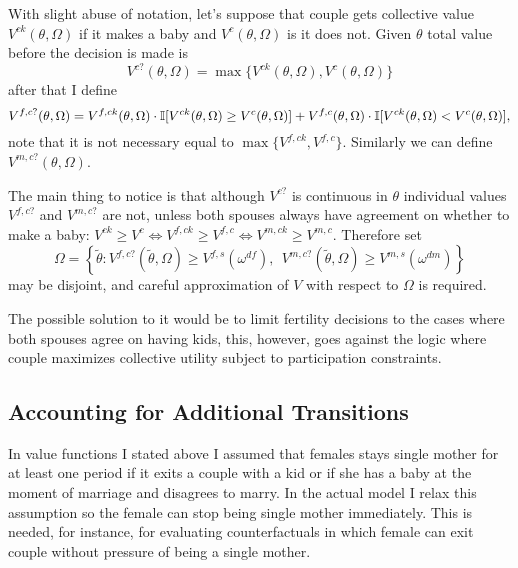 With slight abuse of notation, let's suppose that couple gets collective value $V^{ck}(\theta,\Omega)$ if it makes a baby and $V^{c}(\theta,\Omega)$ is it does not. Given $\theta$ total value before the decision is made is \[V^{c?}(\theta,\Omega) = \max\{ V^{ck}(\theta,\Omega), V^{c}(\theta,\Omega)\}\]
after that I define
\[V^{f,c?}(\theta,\Omega) = V^{f,ck}(\theta,\Omega)\cdot \mathbb{I}[V^{ck}(\theta,\Omega) \geq V^{c}(\theta,\Omega)] + V^{f,c}(\theta,\Omega) \cdot \mathbb{I}[V^{ck}(\theta,\Omega) < V^{c}(\theta,\Omega)],\]
note that it is not necessary equal to $\max\{ V^{f,ck},V^{f,c} \}$. Similarly we can define $V^{m,c?}(\theta,\Omega)$.

The main thing to notice is that although $V^{c?}$ is continuous in $\theta$ individual values $V^{f,c?}$ and $V^{m,c?}$ are not, unless both spouses always have agreement on whether to make a baby: $V^{ck} \geq V^{c} \Leftrightarrow V^{f,ck} \geq V^{f,c} \Leftrightarrow V^{m,ck} \geq V^{m,c}$. Therefore set
\[\Omega = \left\{\tilde{\theta} : V^{f,c?}(\tilde\theta,\Omega) \geq V^{f,s}(\omega^{df}), \ \  V^{m,c?}(\tilde\theta,\Omega) \geq V^{m,s}(\omega^{dm}) \right\}\]
may be disjoint, and careful approximation of $V$ with respect to $\Omega$ is required. 

The possible solution to it would be to limit fertility decisions to the cases where both spouses agree on having kids, this, however, goes against the logic where couple maximizes collective utility subject to participation constraints. 

\subsection{Accounting for Additional Transitions\label{add-trans}}
In value functions I stated above I assumed that females stays single mother for at least one period if it exits a couple with a kid or if she has a baby at the moment of marriage and disagrees to marry. In the actual model I relax this assumption so the female can stop being single mother immediately. This is needed, for instance, for evaluating counterfactuals in which female can exit couple without pressure of being a single mother. 

